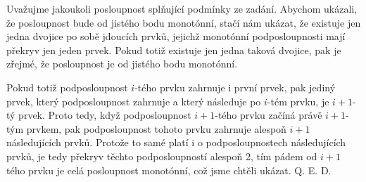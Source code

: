 \documentclass{fkssolpub}
\author{Ondřej Sedláček}
\begin{document}
Uvažujme jakoukoli posloupnost splňující podmínky ze zadání. Abychom
ukázali, že posloupnost bude od jistého bodu monotónní, stačí
nám ukázat, že existuje jen jedna dvojice po sobě jdoucích prvků,
jejichž monotónní podposloupnosti mají překryv jen jeden prvek. Pokud
totiž existuje jen jedna taková dvojice, pak je zřejmé, že posloupnost
je od jistého bodu monotónní.

Pokud totiž podposloupnost $i$-tého prvku zahrnuje i první prvek,
pak jediný prvek, který podposloupnost zahrnuje a který následuje
po $i$-tém prvku, je $i+1$-tý prvek. Proto tedy, když podposloupnost
$i+1$-tého prvku začíná právě $i+1$-tým prvkem, pak podposloupnost
tohoto prvku zahrnuje alespoň $i+1$ následujících prvků. Protože to
samé platí i o podposloupnostech následujících prvků, je tedy překryv
těchto podposloupností alespoň 2, tím pádem od $i+1$ tého prvku je
celá posloupnost monotónní, což jsme chtěli ukázat. Q. E. D.
\end{document}

